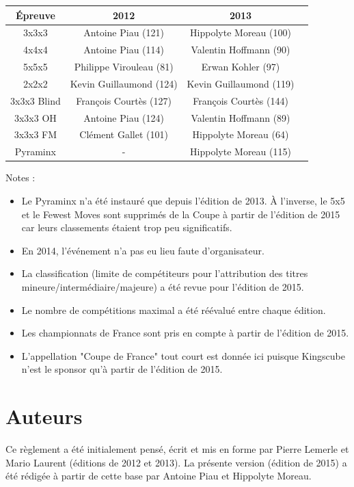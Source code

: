 \documentclass[10pt,a4paper]{article}
\newcommand{\3}{$3\times3$}
\newcommand{\4}{$4\times4$}
\newcommand{\2}{$2\times2$}
\begin{document}
\begin{table}[h]
\begin{center}
\begin{tabular}{|c|c|c|c|}
\hline
Épreuve & 2012 & 2013 \\
\hline
3x3x3 & Antoine Piau (121) & Hippolyte Moreau (100) \\
4x4x4 & Antoine Piau (114) & Valentin Hoffmann (90) \\
5x5x5 & Philippe Virouleau (81) & Erwan Kohler (97) \\
2x2x2 & Kevin Guillaumond (124) & Kevin Guillaumond (119) \\
3x3x3 Blind & François Courtès (127) & François Courtès (144) \\
3x3x3 OH & Antoine Piau (124) & Valentin Hoffmann (89) \\
3x3x3 FM & Clément Gallet (101) & Hippolyte Moreau (64) \\
Pyraminx & - & Hippolyte Moreau (115) \\
\hline
\end{tabular}
\end{center}
\end{table}

Notes : 
\begin{itemize}
\item Le Pyraminx n'a été instauré que depuis l'édition de 2013. À l'inverse, le 5x5 et le Fewest Moves sont supprimés de la Coupe à partir de l'édition de 2015 car leurs classements étaient trop peu significatifs. 
\item En 2014, l'événement n'a pas eu lieu faute d'organisateur. 
\item La classification (limite de compétiteurs pour l'attribution des titres mineure/intermédiaire/majeure) a été revue pour l'édition de 2015.
\item Le nombre de compétitions maximal a été réévalué entre chaque édition.
\item Les championnats de France sont pris en compte à partir de l'édition de 2015.
\item L'appellation "Coupe de France" tout court est donnée ici puisque Kingscube n'est le sponsor qu'à partir de l'édition de 2015.
\end{itemize}

\section{Auteurs}
Ce règlement a été initialement pensé, écrit et mis en forme par Pierre Lemerle et Mario Laurent (éditions de 2012 et 2013). La présente version (édition de 2015) a été rédigée à partir de cette base par Antoine Piau et Hippolyte Moreau.
%
%
%
\end{document}
